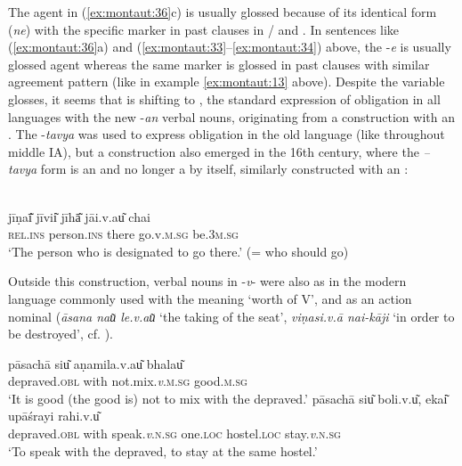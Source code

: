 \documentclass[output=paper]{langsci/langscibook}
\begin{document}
The agent in (\ref{ex:montaut:36}c) is usually glossed  because of its identical form (\textit{ne}) with the specific  marker in  past clauses in / and . In sentences like (\ref{ex:montaut:36}a) and (\ref{ex:montaut:33}--\ref{ex:montaut:34}) above, the  -\textit{e} is usually glossed agent whereas the same marker is glossed  in  past clauses with similar agreement pattern (like in example \ref{ex:montaut:13} above). Despite the variable glosses, it seems that  is shifting to , the standard expression of obligation in all languages with the new -\textit{an} verbal nouns, originating from a construction with an . The  -\textit{tavya}  was used to express obligation in the old language (like throughout middle IA), but a  construction also emerged in the 16th century, where the \textit{–tavya} form is an  and no longer a  by itself, similarly constructed with an :

\ea\label{ex:montaut:37}
\\
\gll jīṇaī͂    jīvii͂          jīhā͂  jāi.v.au͂  chai\\
\textsc{rel.ins}   person.\textsc{ins}    there go.v.\textsc{m.sg} be.\textsc{3m.sg} \\
\glt ‘The person who is designated to go there.’ (= who should go) \citep[67]{Dave1935}
\z 

Outside this construction, verbal nouns in -\textit{v}{}- were also as in the modern language commonly used with the meaning ‘worth of V’, and as an action nominal (\textit{āsana nau͂ le.v.au͂} ‘the taking of the seat’, \textit{viṇasi.v.ā nai-kāji} ‘in order to be destroyed’, cf. \citealt[54]{Dave1935}).
 
\ea \label{ex:montaut:38}    
\ea 
\gll pāsachā siu͂ aṇamila.v.au͂ bhalau͂\\
depraved.\textsc{obl}   with   not.mix.\textit{v}.\textsc{m.sg}   good.\textsc{m.sg} \\
\glt ‘It is good (the good is) not to mix with the depraved.’ \citep[64]{Dave1935}
\ex  
\gll  pāsachā  siu͂ boli.v.u͂, ekai͂        upāśrayi rahi.v.u͂\\
depraved.\textsc{obl} with   speak.\textit{v}.\textsc{n.sg} one.\textsc{loc}   hostel.\textsc{loc}   stay.\textit{v}.\textsc{n.sg} \\
\glt ‘To speak with the depraved, to stay at the same hostel.’ \citep[64]{Dave1935}
\z 
\z 
\end{document}
